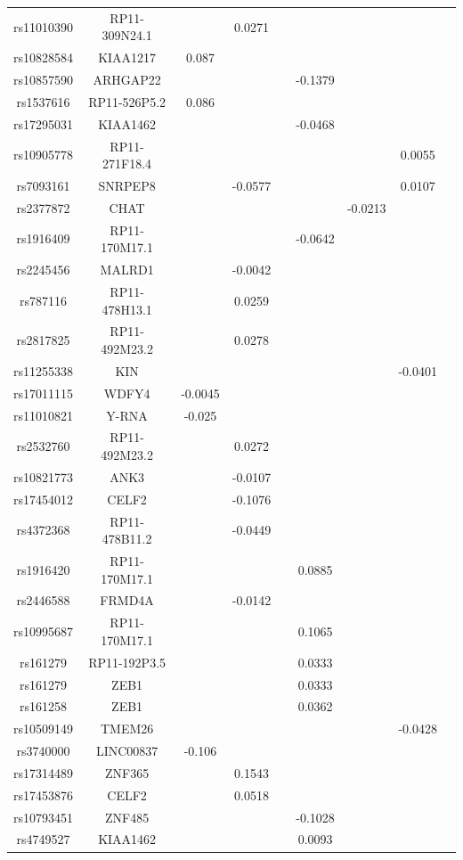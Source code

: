 \documentclass[12pt]{article}
\begin{document}
\begin{longtable}{ c c c c c c c c c}
rs11010390&RP11-309N24.1&  &0.0271 & &  & &  \\
rs10828584&KIAA1217&0.087  & & &  & &  \\
rs10857590&ARHGAP22& & & &-0.1379  & &  \\
rs1537616&RP11-526P5.2&0.086 & & & & &  \\
rs17295031&KIAA1462&  & & &-0.0468 & &  \\
rs10905778&RP11-271F18.4&  & & & & &0.0055  \\
rs7093161&SNRPEP8&  &-0.0577 & & & &0.0107 \\
rs2377872&CHAT&  &  & & &-0.0213 &  \\
rs1916409&RP11-170M17.1&  &  & & -0.0642 &  &  \\
rs2245456&MALRD1&  &-0.0042  & &  &  &  \\
rs787116&RP11-478H13.1&  &0.0259  & &  &  &  \\
rs2817825&RP11-492M23.2&  &0.0278  & &  &  &  \\
rs11255338&KIN&  &   & &  &  &-0.0401  \\
rs17011115&WDFY4&-0.0045  &   & &  &  &   \\
rs11010821&Y-RNA&-0.025  &   & &  &  &   \\
rs2532760&RP11-492M23.2& &0.0272  & &  &  &   \\
rs10821773&ANK3& &-0.0107  & &  &  &   \\
rs17454012&CELF2& &-0.1076 & &  &  &   \\
rs4372368&RP11-478B11.2& &-0.0449 & &  &  &   \\
rs1916420&RP11-170M17.1& &  & &0.0885  &  &   \\
rs2446588&FRMD4A& &-0.0142  & &  &  &   \\
rs10995687&RP11-170M17.1& & & & 0.1065 &  &   \\
rs161279&RP11-192P3.5& & & & 0.0333&  &   \\
rs161279&ZEB1& & & & 0.0333&  &   \\
rs161258&ZEB1& & & & 0.0362&  &   \\
rs10509149&TMEM26& & & &  &  &-0.0428   \\
rs3740000&LINC00837&-0.106 & & &  &  &  \\
rs17314489&ZNF365&  & 0.1543& &  &  &  \\
rs17453876&CELF2&  & 0.0518& &  &  &  \\
rs10793451&ZNF485&  &  & &-0.1028  &  &  \\
rs4749527&KIAA1462&  &  & &0.0093 &  &  \\

\end{longtable}
\end{document}
